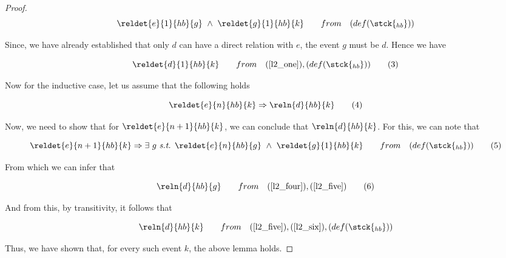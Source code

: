 \begin{proof}
        \[
            \reldet{e}{1}{hb}{g} \ \wedge \ 
            \reldet{g}{1}{hb}{k} \qquad
            from \quad 
            (def(\stck{_{hb}}))
        \]
        
        Since, we have already established that only $d$ can have a direct relation with $e$, the event $g$ must be $d$. Hence we have
        
        \[
            \reldet{d}{1}{hb}{k} \qquad
            from \quad 
            (\ref{l2_one}),
            (def(\stck{_{hb}}))
            \tag{3}
            \label{l2_three}
        \]
        
        Now for the inductive case, let us assume that the following holds
        
        \[
            \reldet{e}{n}{hb}{k} \Rightarrow
            \reln{d}{hb}{k}
            \tag{4}
            \label{l2_four}
        \]
        
        Now, we need to show that for $\reldet{e}{n+1}{hb}{k}$, we can conclude that $\reln{d}{hb}{k}$. For this, we can note that
        
        \[
            \reldet{e}{n+1}{hb}{k} \Rightarrow
            \exists \ g \ \textit{s.t. } 
            \reldet{e}{n}{hb}{g} \ \wedge \ 
            \reldet{g}{1}{hb}{k} \qquad
            from \quad
            (def(\stck{_{hb}}))
            \tag{5}
            \label{l2_five}
        \]
        
        From which we can infer that
        
        \[
            \reln{d}{hb}{g} \qquad
            from \quad
            (\ref{l2_four}),
            (\ref{l2_five})
            \tag{6}
            \label{l2_six}
        \]
        
        And from this, by transitivity, it follows that
        
        \[
            \reln{d}{hb}{k} \qquad
            from \quad
            (\ref{l2_five}),
            (\ref{l2_six}),
            (def(\stck{_{hb}}))
        \]
        
        Thus, we have shown that, for every such event $k$, the above lemma holds. 
    \end{proof}

    
    


